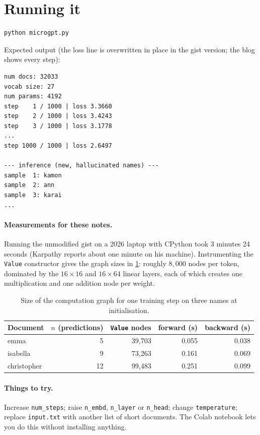 \documentclass[11pt,letterpaper]{article}
\theoremstyle{remark}
\newcommand{\code}[1]{\lstinline[basicstyle=\ttfamily\small]|#1|}
\begin{document}
\section{Running it}
\label{sec:runit}

\begin{lstlisting}[language=bash]
python microgpt.py
\end{lstlisting}

Expected output (the loss line is overwritten in place in the gist version; the blog shows every step):
\begin{lstlisting}[language={}]
num docs: 32033
vocab size: 27
num params: 4192
step    1 / 1000 | loss 3.3660
step    2 / 1000 | loss 3.4243
step    3 / 1000 | loss 3.1778
...
step 1000 / 1000 | loss 2.6497

--- inference (new, hallucinated names) ---
sample  1: kamon
sample  2: ann
sample  3: karai
...
\end{lstlisting}

\paragraph{Measurements for these notes.} Running the unmodified gist on a 2026 laptop with CPython took 3 minutes 24 seconds (Karpathy reports about one minute on his machine). Instrumenting the \code{Value} constructor gives the graph sizes in \cref{tab:nodes}: roughly $8{,}000$ nodes per token, dominated by the $16\times 16$ and $16\times 64$ linear layers, each of which creates one multiplication and one addition node per weight.

\begin{table}[h]
\centering\small
\begin{tabular}{@{}lrrrr@{}}
\toprule
Document & $n$ (predictions) & \code{Value} nodes & forward (s) & backward (s)\\
\midrule
emma        & 5  & 39{,}703 & 0.055 & 0.038 \\
isabella    & 9  & 73{,}263 & 0.161 & 0.069 \\
christopher & 12 & 99{,}483 & 0.251 & 0.099 \\
\bottomrule
\end{tabular}
\caption{Size of the computation graph for one training step on three names at initialisation.}
\label{tab:nodes}
\end{table}

\paragraph{Things to try.} Increase \code{num_steps}; raise \code{n_embd}, \code{n_layer} or \code{n_head}; change \code{temperature}; replace \texttt{input.txt} with another list of short documents. The Colab notebook \parencite{karpathy2026microgptcolab} lets you do this without installing anything.
\end{document}
